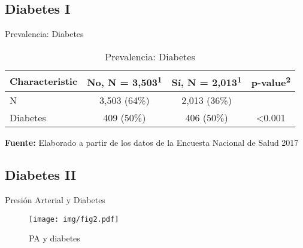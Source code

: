 \documentclass[aspectratio=169]{beamer}
\begin{document}
\subsection*{Diabetes I}
\begin{frame}{Prevalencia: Diabetes}
    \begin{table}[]
\caption{\small Prevalencia: Diabetes}
    \centering
    \small

    \captionsetup[table]{labelformat=empty,skip=1pt}
\begin{tabular}{lccc}
\toprule
\textbf{Characteristic} & \textbf{No}, N = 3,503\textsuperscript{1} & \textbf{Sí}, N = 2,013\textsuperscript{1} & \textbf{p-value}\textsuperscript{2} \\ 
\midrule
N & 3,503 (64\%) & 2,013 (36\%) &  \\ 
Diabetes & 409 (50\%) & 406 (50\%) & <0.001 \\ 
 \bottomrule
\end{tabular}
    \vspace{5mm}
    
    {\raggedright \small \textbf{Fuente:} Elaborado a partir de los datos de la Encuesta Nacional de Salud 2017 \par}
\end{table}
\end{frame}

\subsection*{Diabetes II}
\begin{frame}{Presión Arterial y Diabetes}
    \begin{figure}
        \centering
        \texttt{[image: img/fig2.pdf]}
        \caption{PA y diabetes}
        \label{fig:my_label}
    \end{figure}
\end{frame}
\end{document}
